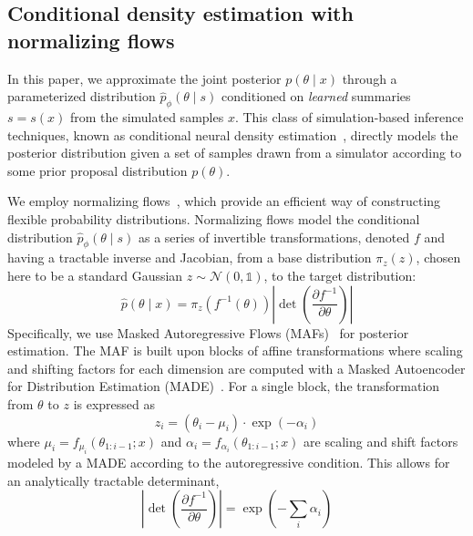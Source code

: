 \documentclass[prd,aps,10pt,nofootinbib,twocolumn,superscriptaddress,preprintnumbers,balancelastpage,longbibliography]{revtex4-1}
\begin{document}
\subsection{Conditional density estimation with normalizing flows}

In this paper, we approximate the joint posterior $p(\theta\mid x)$ through a parameterized distribution $\hat p_\phi(\theta\mid s)$ conditioned on \emph{learned} summaries $s=s(x)$ from the simulated samples $x$. This class of simulation-based inference techniques, known as conditional neural density estimation~\cite{papamakariosFastEpsilonFree2018}, directly models the posterior distribution given a set of samples drawn from a simulator according to some prior proposal distribution $p(\theta)$.

We employ normalizing flows~\cite{papamakarios2019normalizing,rezende2015variational}, which provide an efficient way of constructing flexible probability distributions. Normalizing flows model the conditional distribution $\hat p_\phi(\theta\mid s)$ as a series of invertible transformations, denoted $f$ and having a tractable inverse and Jacobian, from a base distribution $\pi_z({z})$, chosen here to be a standard Gaussian $z\sim \mathcal N(0, \mathbb{1})$, to the target distribution:
\begin{equation}
    \hat{p}({\theta} \mid {x})=\pi_{z}\left(f^{-1}({\theta})\right)\left|\operatorname{det}\left(\frac{\partial f^{-1}}{\partial {\theta}}\right)\right|
\end{equation}
Specifically, we use Masked Autoregressive Flows (MAFs)~\cite{10.5555/3294771.3294994} for posterior estimation. The MAF is built upon blocks of affine transformations where scaling and shifting factors for each dimension are computed with a Masked Autoencoder for Distribution Estimation (MADE)~\cite{germain2015made}. For a single block, the transformation from $\theta$ to $z$ is expressed as 
\begin{equation}
    \label{eq:maf_z}
    z_{i}=\left(\theta_{i}-\mu_{i}\right) \cdot \exp \left(-\alpha_{i}\right)
\end{equation}
where $\mu_{i}=f_{\mu_{i}}\left({\theta}_{1: i-1} ; {x}\right)$ and $\alpha_i = f_{\alpha_{i}}\left({\theta}_{1: i-1} ; {x}\right)$ are scaling and shift factors modeled by a MADE according to the autoregressive condition. This allows for an analytically tractable determinant,
\begin{equation}
    \label{eq:det}
    \left|\operatorname{det}\left(\frac{\partial f^{-1}}{\partial {\theta}}\right)\right|=\exp \left(-\sum_{i} \alpha_{i}\right)
\end{equation}
\end{document}
